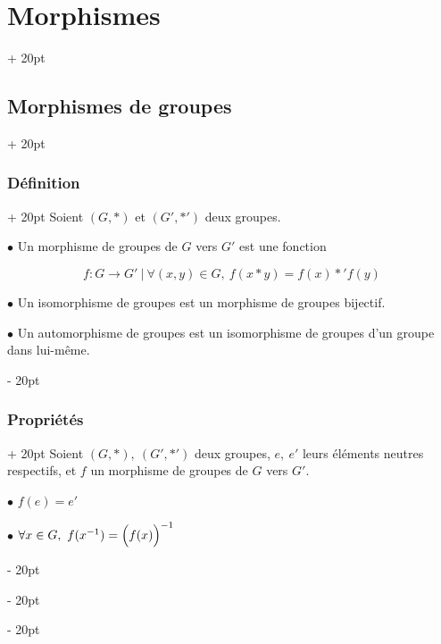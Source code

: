 \documentclass[a4paper, 12pt, twoside]{article}
\newcommand{\lr}[1]{\left( #1 \right)}
\newcommand{\ind}[1][20pt]{\advance\leftskip + #1}
\newcommand{\deind}[1][20pt]{\advance\leftskip - #1}
\newenvironment{indentedenv}[1][20pt]{\par \ind[#1]}{\par \deind}
\newenvironment{indt}[2][20pt]{#2 \begin{indentedenv}[#1]}{\end{indentedenv}} %
\begin{document}
    \vspace{12pt}
    
    \begin{indt}{\section{Morphismes}}
        \begin{indt}{\subsection{Morphismes de groupes}}
            \begin{indt}{\subsubsection{Définition}}
                Soient $(G, *)$ et $(G', *')$ deux groupes.
                
                \vspace{6pt}
                
                $\bullet$ Un morphisme de groupes de $G$ vers $G'$ est une fonction
                
                \[ f : G \longrightarrow G'\ |\ \forall (x, y) \in G,\ f(x * y) = f(x) *' f(y) \]
                
                $\bullet$ Un isomorphisme de groupes est un morphisme de groupes bijectif.
                
                $\bullet$ Un automorphisme de groupes est un isomorphisme de groupes d'un groupe dans lui-même.
            \end{indt}
            
            \vspace{6pt}
            
            \begin{indt}{\subsubsection{Propriétés}}
                Soient $(G, *),\ (G', *')$ deux groupes, $e,\ e'$ leurs éléments neutres respectifs, et $f$ un morphisme de groupes de $G$ vers $G'$.
                
                \vspace{6pt}
                
                $\bullet$ $f(e) = e'$
                
                $\bullet$ $\forall x \in G,\ f(x^{-1}) = \lr{f(x) \vphantom{\dfrac a b}}^{-1}$
                

\end{indt}
\end{indt}
\end{indt}
\end{document}
